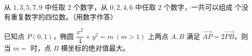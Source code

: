 \begin{question}
从 $1, 3, 5, 7, 9$ 中任取 $2$ 个数字，从 $0, 2, 4, 6$ 中任取 $2$ 个数字，一共可以组成 \underline{\hspace{2cm}} 个没有重复数字的四位数。（用数字作答）

\end{question}
\begin{question}
已知点 $P(0, 1)$，椭圆 $\dfrac{x^2}{4} + y^2 = m\ (m > 1)$ 上两点 $A, B$ 满足 $\overrightarrow{AP} = 2\overrightarrow{PB}$，则当 $m =$ \underline{\hspace{2cm}} 时，点 $B$ 横坐标的绝对值最大。

\par\medskip

\end{question}

